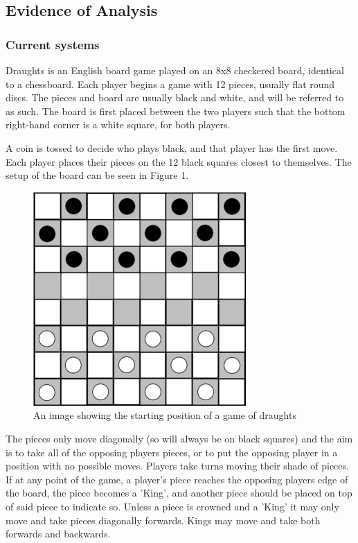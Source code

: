 \documentclass{article}
\makeatletter
\newcommand\subsubsubsection{\@startsection{paragraph}{4}{\z@}{-2.5ex\@plus -1ex \@minus -.25ex}{1.25ex \@plus .25ex}{\normalfont\normalsize\bfseries}}
\makeatother
\begin{document}
    \subsection{Evidence of Analysis}

    \subsubsection{Current systems}

    \subsubsubsection{Draughts} \label{Draughts}
    Draughts is an English board game played on an 8x8 checkered board, identical to a chessboard.
    Each player begins a game with 12 pieces, usually flat round discs.
    The pieces and board are usually black and white, and will be referred to as such.
    The board is first placed between the two players such that the bottom right-hand corner is a white square,
    for both players.
    
    A coin is tossed to decide who plays black, and that player has the first move. Each player places their pieces
    on the 12 black squares closest to themselves. The setup of the board can be seen in Figure 1. 

    \begin{figure}
        \centering
        \includegraphics[scale=0.35]{The-starting-position-for-checkers.png}
        \caption{An image showing the starting position of a game of draughts}
    \end{figure}
    The pieces only move diagonally (so will always be on black squares)
    and the aim is to take all of the opposing players pieces, or to put the opposing player in a position with no possible moves.
    Players take turns moving their shade of pieces. If at any point of the game, a player's piece reaches the opposing players edge
    of the board, the piece becomes a 'King', and another piece should be placed on top of said piece to indicate so.
    Unless a piece is crowned and a 'King' it may only move and take pieces diagonally forwards. Kings may move and take both forwards and backwards.
    
\end{document}
